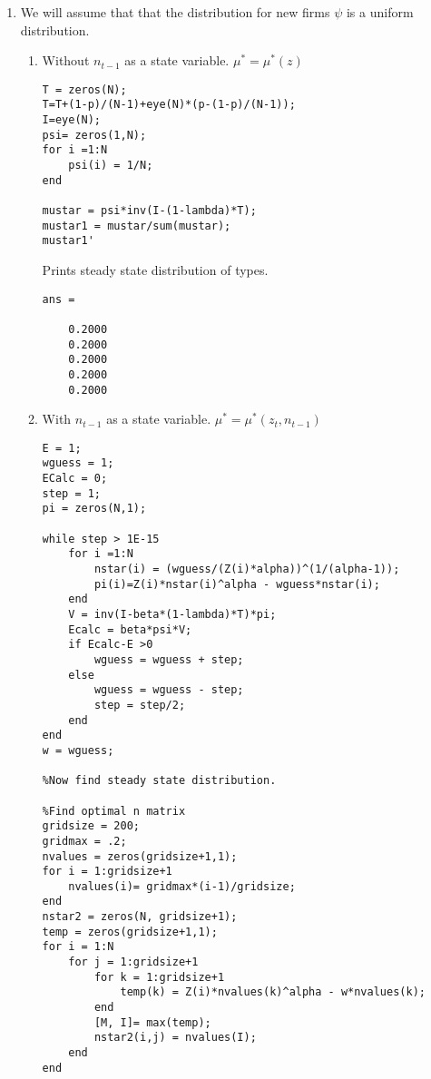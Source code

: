 \documentclass[12pt]{article}
\begin{document}
\begin{onehalfspace}
\begin{enumerate}[1.]
\begin{lstlisting}
Z = zeros(1,N);
nstar = zeros(N,1);
for i =1:N
    Z(i) = i;
    nstar(i) = (w/(Z(i)*alpha))^(1/(alpha-1));
end

nstar
    \end{lstlisting}
    Prints $n^*$:
    \begin{lstlisting}
nstar =

    0.3046
    3.0697
   11.8594
   30.9405
   65.0969
    \end{lstlisting}
    The aggregate labor input is:
    $\sum\limits_{z}\mu_t(z) n^*(z)$
    Or in matrix notation: $\mu_t n^*$ where $mu_t$ is the 1xN measure over types and $n^*$ is the the Nx1 vector of optimal employment over types.
    \item
    We will assume that that the distribution for new firms $\psi$ is a uniform distribution.
    \begin{enumerate}
        \item Without $n_{t-1}$ as a state variable. $\mu^*=\mu^*(z)$
        \begin{lstlisting}
T = zeros(N);
T=T+(1-p)/(N-1)+eye(N)*(p-(1-p)/(N-1));
I=eye(N);
psi= zeros(1,N);
for i =1:N
    psi(i) = 1/N;
end

mustar = psi*inv(I-(1-lambda)*T);
mustar1 = mustar/sum(mustar);
mustar1'
    \end{lstlisting}
Prints steady state distribution of types.
\begin{lstlisting}
ans =

    0.2000
    0.2000
    0.2000
    0.2000
    0.2000
\end{lstlisting}
        \item With $n_{t-1}$ as a state variable. $\mu^*=\mu^*(z_t, n_{t-1})$
        \begin{lstlisting}
E = 1;
wguess = 1;
ECalc = 0;
step = 1;
pi = zeros(N,1);

while step > 1E-15
    for i =1:N
        nstar(i) = (wguess/(Z(i)*alpha))^(1/(alpha-1));
        pi(i)=Z(i)*nstar(i)^alpha - wguess*nstar(i);
    end
    V = inv(I-beta*(1-lambda)*T)*pi;
    Ecalc = beta*psi*V;
    if Ecalc-E >0
        wguess = wguess + step;
    else
        wguess = wguess - step;
        step = step/2;
    end
end
w = wguess;

%Now find steady state distribution.

%Find optimal n matrix
gridsize = 200;
gridmax = .2;
nvalues = zeros(gridsize+1,1);
for i = 1:gridsize+1
    nvalues(i)= gridmax*(i-1)/gridsize; 
end
nstar2 = zeros(N, gridsize+1);
temp = zeros(gridsize+1,1);
for i = 1:N
    for j = 1:gridsize+1
        for k = 1:gridsize+1
            temp(k) = Z(i)*nvalues(k)^alpha - w*nvalues(k);
        end
        [M, I]= max(temp);
        nstar2(i,j) = nvalues(I);
    end
end


\end{lstlisting}
\end{enumerate}
\end{enumerate}
\end{onehalfspace}
\end{document}
